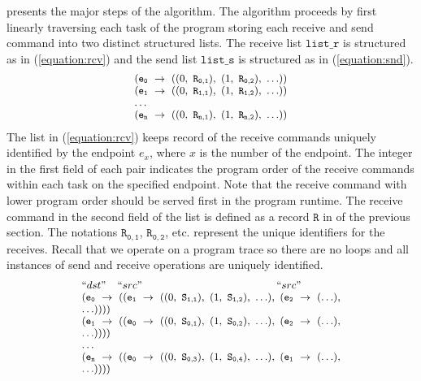  presents the major steps of the algorithm. The algorithm proceeds by first linearly traversing each task of the program storing each receive and send command into two distinct structured lists. The receive list $\mathtt{list\_r}$ is structured as in (\ref{equation:rcv}) and the send list $\mathtt{list\_s}$ is structured as in (\ref{equation:snd}).
\begin{equation}
\footnotesize \begin{array}{l}
(\mathtt{e_0}\ \rightarrow\ ((0,\ \mathtt{R_{0,1}}),\ (1,\ \mathtt{R_{0,2}}),\ \ldots))\\
(\mathtt{e_1}\ \rightarrow\ ((0,\ \mathtt{R_{1,1}}),\ (1,\ \mathtt{R_{1,2}}),\ \ldots))\\
\ldots \\
(\mathtt{e_n}\ \rightarrow\ ((0,\ \mathtt{R_{n,1}}),\ (1,\ \mathtt{R_{n,2}}),\ \ldots))\\
\end{array}
\label{equation:rcv}
\end{equation}
The list in (\ref{equation:rcv}) keeps record of the receive commands uniquely identified by the endpoint $\mathit{e}_x$, where $x$ is the number of the endpoint. The integer in the first field of each pair indicates the program order of the receive commands within each task on the specified endpoint. Note that the receive command with lower program order should be served first in the program runtime. The receive command in the second field of the list is defined as a record $\mathtt{R}$ in  of the previous section. The notations $\mathtt{R_{0,1}}$, $\mathtt{R_{0,2}}$, etc. represent the unique identifiers for the receives. Recall that we operate on a program trace so there are no loops and all instances of send and receive operations are uniquely identified.
\begin{equation}
\footnotesize \begin{array}{l}
 ``dst" \;\;\;\; ``src" \;\;\;\;\;\;\;\;\;\;\;\;\;\;\;\;\;\;\;\;\;\;\;\;\;\;\;\;\;\;\;\;\;\;\;\;\;\;\;\;\;\;\;\;\;\; ``src"\\
(\mathtt{e_0}\ \rightarrow\ ((\mathtt{e_1}\ \rightarrow\ ((0,\ \mathtt{S_{1,1}}),\ (1,\ \mathtt{S_{1,2}}),\ \ldots),\ (\mathtt{e_2}\ \rightarrow\ (\ldots),\\ \ldots))))\\
(\mathtt{e_1}\ \rightarrow\ ((\mathtt{e_0}\ \rightarrow\ ((0,\ \mathtt{S_{0,1}}),\ (1,\ \mathtt{S_{0,2}}),\ \ldots),\ (\mathtt{e_2}\ \rightarrow\ (\ldots),\\ \ldots))))\\
 \dots\\
(\mathtt{e_n}\ \rightarrow\ ((\mathtt{e_0}\ \rightarrow\ ((0,\ \mathtt{S_{0,3}}),\ (1,\ \mathtt{S_{0,4}}),\ \ldots),\ (\mathtt{e_1}\ \rightarrow\ (\ldots),\\ \ldots))))\\
\end{array}
\label{equation:snd}
\end{equation}

